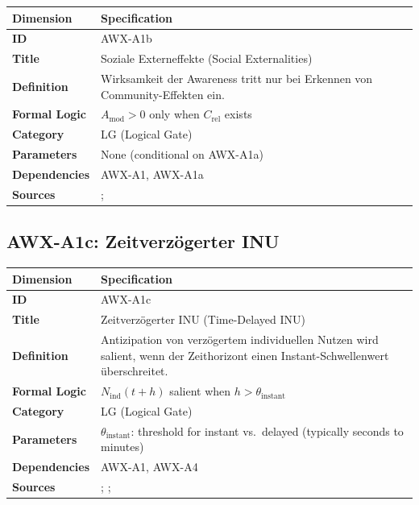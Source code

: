 \begin{table}[htbp]
\small
\begin{tabular}{p{3cm}p{11cm}}
\toprule
\textbf{Dimension} & \textbf{Specification} \\
\midrule
\textbf{ID} & AWX-A1b \\
\textbf{Title} & Soziale Externeffekte (Social Externalities) \\
\textbf{Definition} & Wirksamkeit der Awareness tritt nur bei Erkennen von Community-Effekten ein. \\
\textbf{Formal Logic} & $A_{\text{mod}} > 0$ only when $C_{\text{rel}}$ exists \\
\textbf{Category} & LG (Logical Gate) \\
\textbf{Parameters} & None (conditional on AWX-A1a) \\
\textbf{Dependencies} & AWX-A1, AWX-A1a \\
\textbf{Sources} & \citet{PAP-fehr2003nature}; \citet{PAP-gaechter2002altruistic} \\
\bottomrule
\end{tabular}
\end{table}


\subsection{AWX-A1c: Zeitverzögerter INU}

\begin{table}[htbp]
\small
\begin{tabular}{p{3cm}p{11cm}}
\toprule
\textbf{Dimension} & \textbf{Specification} \\
\midrule
\textbf{ID} & AWX-A1c \\
\textbf{Title} & Zeitverzögerter INU (Time-Delayed INU) \\
\textbf{Definition} & Antizipation von verzögertem individuellen Nutzen wird salient, wenn der Zeithorizont einen Instant-Schwellenwert überschreitet. \\
\textbf{Formal Logic} & $N_{\text{ind}}(t+h)$ salient when $h > \theta_{\text{instant}}$ \\
\textbf{Category} & LG (Logical Gate) \\
\textbf{Parameters} & $\theta_{\text{instant}}$: threshold for instant vs.\ delayed (typically seconds to minutes) \\
\textbf{Dependencies} & AWX-A1, AWX-A4 \\
\textbf{Sources} & \citet{frederick2002time}; \citet{laibson1997golden}; \citet{benartzi1995myopic} \\
\bottomrule
\end{tabular}
\end{table}

